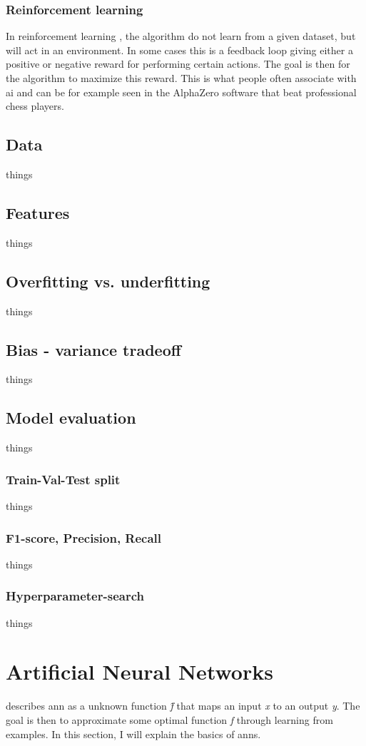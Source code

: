         \subsubsection{Reinforcement learning}
            In reinforcement learning \cite{Goodfellow-et-al-2016_E}, the algorithm do not learn from a given dataset, but will act in an environment. In some cases this is a feedback loop giving either a positive or negative reward for performing certain actions. The goal is then for the algorithm to maximize this reward. This is what people often associate with \gls{ai} and can be for example seen in the AlphaZero software that beat professional chess players\cite{silver2017mastering}.
    
    \subsection{Data}
        things
    \subsection{Features}
        things
    \subsection{Overfitting vs. underfitting}
        things
    \subsection{Bias - variance tradeoff}
        things
    \subsection{Model evaluation}
        things
    \subsubsection{Train-Val-Test split}
        things
    \subsubsection{F1-score, Precision, Recall} \label{f1_score}
        things
    \subsubsection{Hyperparameter-search}
        things

\section{Artificial Neural Networks} \label{neural networks}
    \citeauthor{Goodfellow-et-al-2016_NN} \cite{Goodfellow-et-al-2016_NN} describes \gls{ann} as a unknown function \textit{\^{f}} that maps an input \textit{x} to an output \textit{y}. The goal is then to approximate some optimal function \textit{f} through learning from examples. In this section, I will explain the basics of \gls{ann}s.

